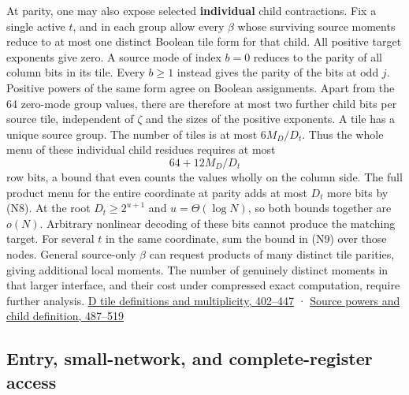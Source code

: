 \documentclass[11pt,a4paper]{article}
\begin{document}
At parity, one may also expose selected \textbf{individual} child
contractions. Fix a single active \(t\), and in each group allow every
\(\beta\) whose surviving source moments reduce to at most one distinct
Boolean tile form for that child. All positive target exponents give
zero. A source mode of index \(b=0\) reduces to the parity of all column
bits in its tile. Every \(b\ge1\) instead gives the parity of the bits
at odd \(j\). Positive powers of the same form agree on Boolean
assignments. Apart from the 64 zero-mode group values, there are
therefore at most two further child bits per source tile, independent of
\(\zeta\) and the sizes of the positive exponents. A tile has a unique
source group. The number of tiles is at most \(6M_D/D_t\). Thus the
whole menu of these individual child residues requires at most \[
 64+12M_D/D_t
\tag{N9}
\] row bits, a bound that even counts the values wholly on the column
side. The full product menu for the entire coordinate at parity adds at
most \(D_t\) more bits by (N8). At the root \(D_t\ge 2^{u+1}\) and
\(u=\Theta(\log N)\), so both bounds together are \(o(N)\). Arbitrary
nonlinear decoding of these bits cannot produce the matching target. For
several \(t\) in the same coordinate, sum the bound in (N9) over those
nodes. General source-only \(\beta\) can request products of many
distinct tile parities, giving additional local moments. The number of
genuinely distinct moments in that larger interface, and their cost
under compressed exact computation, require further analysis.
\href{https://github.com/openai/math/blob/main/preprints/The-Exponential-Time-Hypothesis-is-False-October-25-2026/build/quantitative-contraction.tex\#L402}{D
tile definitions and multiplicity, 402--447} ·
\href{https://github.com/openai/math/blob/main/preprints/The-Exponential-Time-Hypothesis-is-False-October-25-2026/build/quantitative-contraction.tex\#L487}{Source
powers and child definition, 487--519}

\subsection{Entry, small-network, and complete-register
access}\label{v8-entry-small-network-and-complete-register-access}
\end{document}
